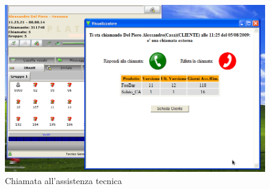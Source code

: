 \begin{figure}[!ht]
\centering
  \includegraphics[scale=0.6]{./images/chiamata_assistenza.png}
\caption{Chiamata all'assistenza tecnica}
\label{technical_call}
\end{figure}

\newpage
